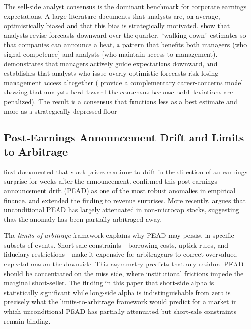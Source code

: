 \documentclass[11pt]{article}
\begin{document}
The sell-side analyst consensus is the dominant benchmark for corporate earnings expectations. A large literature documents that analysts are, on average, optimistically biased and that this bias is strategically motivated. \citet{richardson2004walk} show that analysts revise forecasts downward over the quarter, ``walking down'' estimates so that companies can announce a beat, a pattern that benefits both managers (who signal competence) and analysts (who maintain access to management). \citet{matsumoto2002management} demonstrates that managers actively guide expectations downward, and \citet{ke2006effect} establishes that analysts who issue overly optimistic forecasts risk losing management access altogether (\citet{hong2000security} provide a complementary career-concerns model showing that analysts herd toward the consensus because bold deviations are penalized). The result is a consensus that functions less as a best estimate and more as a strategically depressed floor.

\subsection{Post-Earnings Announcement Drift and Limits to Arbitrage}

\citet{ball1968empirical} first documented that stock prices continue to drift in the direction of an earnings surprise for weeks after the announcement. \citet{bernard1989post} confirmed this post-earnings announcement drift (PEAD) as one of the most robust anomalies in empirical finance, and \citet{livnat2006comparing} extended the finding to revenue surprises. More recently, \citet{martineau2022pead} argues that unconditional PEAD has largely attenuated in non-microcap stocks, suggesting that the anomaly has been partially arbitraged away.

The \textit{limits of arbitrage} framework \citep{shleifer1997limits} explains why PEAD may persist in specific subsets of events. Short-sale constraints---borrowing costs, uptick rules, and fiduciary restrictions---make it expensive for arbitrageurs to correct overvalued expectations on the downside. This asymmetry predicts that any residual PEAD should be concentrated on the miss side, where institutional frictions impede the marginal short-seller. The finding in this paper that short-side alpha is statistically significant while long-side alpha is indistinguishable from zero is precisely what the limits-to-arbitrage framework would predict for a market in which unconditional PEAD has partially attenuated but short-sale constraints remain binding.
\end{document}
